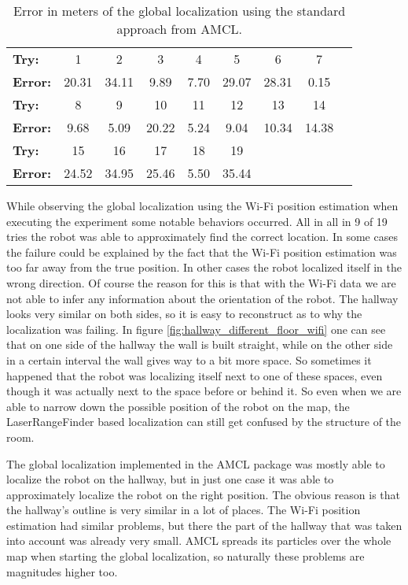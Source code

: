 \begin{table} \label{table:exp2gl}
\caption{Error in meters of the global localization using the standard approach from AMCL.}
\begin{tabular}{l*{7}{c}r}
  \hline			
  \bf Try: & 1 & 2 & 3 & 4 & 5 & 6 & 7 \\
  \bf Error: & 20.31 & 34.11 & 9.89 & 7.70 & 29.07 & 28.31 & 0.15 \\  
    \hline			
    \bf Try: & 8 & 9 & 10 & 11 & 12 & 13 & 14 \\
    \bf Error: & 9.68 & 5.09 & 20.22 & 5.24 & 9.04 & 10.34 & 14.38 \\
        \hline			
        \bf Try: & 15 & 16 & 17 & 18 & 19 \\
        \bf Error: & 24.52 & 34.95 & 25.46 & 5.50 & 35.44 \\
        \hline  
\end{tabular}
\end{table}

While observing the global localization using the Wi-Fi position estimation when executing the experiment some notable behaviors occurred. All in all in 9 of 19 tries the robot was able to approximately find the correct location. In some cases the failure could be explained by the fact that the Wi-Fi position estimation was too far away from the true position. In other cases the robot localized itself in the wrong direction. Of course the reason for this is that with the Wi-Fi data we are not able to infer any information about the orientation of the robot. The hallway looks very similar on both sides, so it is easy to reconstruct as to why the localization was failing. In figure \ref{fig:hallway_different_floor_wifi} one can see that on one side of the hallway the wall is built straight, while on the other side in a certain interval the wall gives way to a bit more space. So sometimes it happened that the robot was localizing itself next to one of these spaces, even though it was actually next to the space before or behind it. So even when we are able to narrow down the possible position of the robot on the map, the \gls{LaserRangeFinder} based localization can still get confused by the structure of the room. 

The global localization implemented in the AMCL package was mostly able to localize the robot on the hallway, but in just one case it was able to approximately localize the robot on the right position. The obvious reason is that the hallway's outline is very similar in a lot of places. The Wi-Fi position estimation had similar problems, but there the part of the hallway that was taken into account was already very small. AMCL spreads its particles over the whole map when starting the global localization, so naturally these problems are magnitudes higher too.

